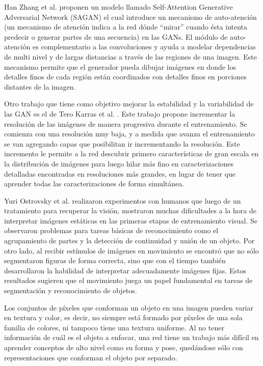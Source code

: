 \documentclass[spanish]{report}
\begin{document}
Han Zhang et al. proponen un modelo llamado Self-Attention Generative Adversarial Network (SAGAN) \cite{2018arXiv180508318Z} el cual introduce un mecanismo de auto-atención (un mecanismo de atención indica a la red dónde ``mirar'' cuando ésta intenta predecir o generar partes de una secuencia) en las GANs. El módulo de auto-atención es complementario a las convoluciones y ayuda a modelar dependencias de multi nivel y de largas distancias a través de las regiones de una imagen. Este mecanismo permite que el generador pueda dibujar imágenes en donde los detalles finos de cada región están coordinados con detalles finos en porciones distantes de la imagen.

Otro trabajo que tiene como objetivo mejorar la estabilidad y la variabilidad de las GAN es el de Tero Karras et al. \cite{DBLP:journals/corr/abs-1710-10196}. Este trabajo propone incrementar la resolución de las imágenes de manera progresiva durante el entrenamiento. Se comienza con una resolución muy baja, y a medida que avanza el entrenamiento se van agregando capas que posibilitan ir incrementando la resolución. Este incremento le permite a la red descubrir primero características de gran escala en la distribución de imágenes para luego hilar más fino en caracterizaciones detalladas encontradas en resoluciones más grandes, en lugar de tener que aprender todas las caracterizaciones de forma simultánea.

Yuri Ostrovsky et al. \cite{visual_parsing} realizaron experimentos con humanos que luego de un tratamiento para recuperar la visión, mostraron muchas dificultades a la hora de interpretar imágenes estáticas en las primeras etapas de entrenamiento visual. Se observaron problemas para tareas básicas de reconocimiento como el agrupamiento de partes y la detección de continuidad y unión de un objeto. Por otro lado, al recibir estímulos de imágenes en movimiento se encontró que no sólo segmentaron figuras de forma correcta, sino que con el tiempo también desarrollaron la habilidad de interpretar adecuadamente imágenes fijas. Estos resultados sugieren que el movimiento juega un papel fundamental en tareas de segmentación y reconocimiento de objetos.

Los conjuntos de píxeles que conforman un objeto en una imagen pueden variar en textura y color, es decir, no siempre está formado por píxeles de una sola familia de colores, ni tampoco tiene una textura uniforme. Al no tener información de cuál es el objeto a enfocar, una red tiene un trabajo más difícil en aprender conceptos de alto nivel como su forma y pose, quedándose sólo con representaciones que conforman el objeto por separado.
\end{document}
